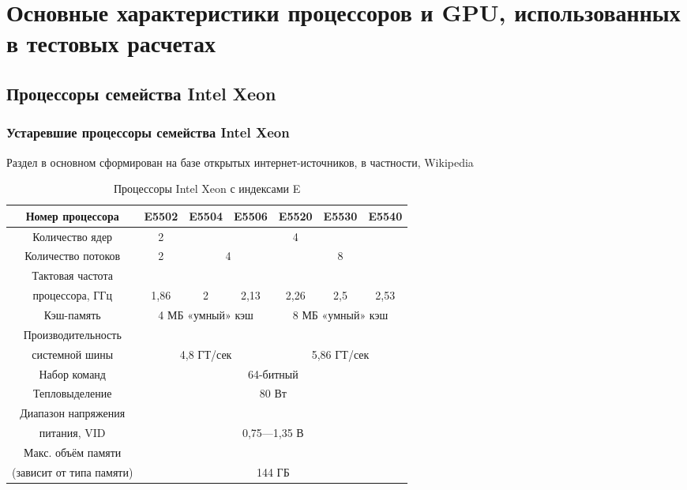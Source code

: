 \chapter{Основные характеристики процессоров и GPU, использованных в тестовых расчетах} \label{AppendixA}

\section{Процессоры семейства Intel Xeon}
\subsection{Устаревшие процессоры семейства Intel Xeon}
Раздел в основном сформирован на базе открытых интернет-источников, в частности, Wikipedia 

\begin{center}
\begin{table}[ht]
\caption{Процессоры Intel Xeon с индексами E}
	\begin{tabular}{|c|c|c|c|c|c|c|}
		\hline
		Номер процессора & E5502 & E5504 & E5506 & E5520 & E5530 & E5540 \\ \hline
		Количество ядер  & 2 & \multicolumn{5}{c|}{4} \\ \hline
		Количество потоков & 2 & \multicolumn{2}{c|}{4} & \multicolumn{3}{c|}{8} \\ \hline
		Тактовая частота   &          &       &          &          &          &  \\
		процессора, ГГц    & 1,86  & 2  & 2,13 & 2,26 & 2,5 & 2,53 \\ \hline
		Кэш-память         & \multicolumn{3}{c|}{4 МБ «умный» кэш} & \multicolumn{3}{c|}{8 МБ «умный» кэш} \\ \hline
		Производительность &  \multicolumn{3}{c|}{}          & \multicolumn{3}{c|}{} \\   
		системной шины     & \multicolumn{3}{c|}{4,8 ГТ/сек} & \multicolumn{3}{c|}{5,86 ГТ/сек} \\ \hline
		Набор команд       &\multicolumn{6}{c|}{64-битный} \\ \hline
		Тепловыделение     & \multicolumn{6}{c|}{80 Вт} \\ \hline
		Диапазон напряжения & \multicolumn{6}{c|}{}  \\
		питания, VID        & \multicolumn{6}{c|}{0,75—1,35 В} \\ \hline
		Макс. объём памяти  & \multicolumn{6}{c|}{}  \\
		(зависит от типа памяти) & \multicolumn{6}{c|}{144 ГБ} \\ \hline

\end{tabular}
\end{table}
\end{center}

